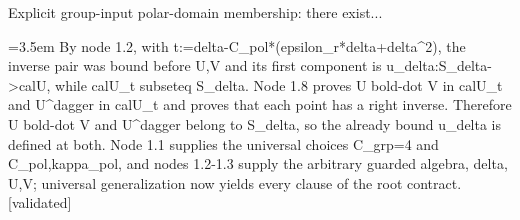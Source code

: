 \documentclass{article}
\newcommand{\step}[1]{\par\noindent\hangindent=3.5em\hangafter=1%
  \makebox[3.5em][l]{\textbf{#1.}}}
\newcommand{\steptag}[1]{\hfill{\small\textsf{[#1]}}}
\begin{document}
\begin{proofbox}{Explicit group-input polar-domain membership: there exist...}
\step{1.9.2} By node 1.2, with t:=delta-C\_pol*(epsilon\_r*delta+delta\textasciicircum{}2), the inverse pair was bound before U,V and its first component is u\_delta:S\_delta->calU, while calU\_t subseteq S\_delta. Node 1.8 proves U bold-dot V in calU\_t and U\textasciicircum{}dagger in calU\_t and proves that each point has a right inverse. Therefore U bold-dot V and U\textasciicircum{}dagger belong to S\_delta, so the already bound u\_delta is defined at both. Node 1.1 supplies the universal choices C\_grp=4 and C\_pol,kappa\_pol, and nodes 1.2-1.3 supply the arbitrary guarded algebra, delta, U,V; universal generalization now yields every clause of the root contract. \steptag{validated} \\[4pt]
\end{proofbox}
\end{document}
